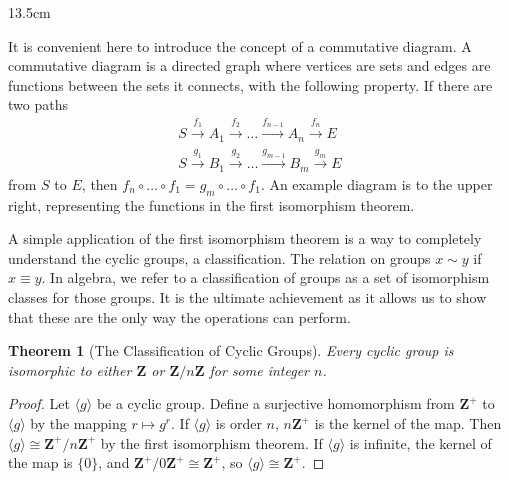 \documentclass[12pt]{report}
\newtheorem{theorem}{Theorem}[section]
\begin{document}
\begin{wrapfigure}{1}{3.5cm}
\end{wrapfigure}

It is convenient here to introduce the concept of a commutative diagram. A commutative diagram is a directed graph where vertices are sets and edges are functions between the sets it connects, with the following property. If there are two paths
%
\begin{align*}
    S \xrightarrow{f_1} A_1 \xrightarrow{f_2} \dots \xrightarrow{f_{n-1}} A_n \xrightarrow{f_n} E\\
    S \xrightarrow{g_1} B_1 \xrightarrow{g_2} \dots \xrightarrow{g_{m-1}} B_m \xrightarrow{g_m} E
\end{align*}
from $S$ to $E$, then $f_n \circ \dots \circ f_1 = g_m \circ \dots \circ f_1$. An example diagram is to the upper right, representing the functions in the first isomorphism theorem.

A simple application of the first isomorphism theorem is a way to completely understand the cyclic groups, a classification. The relation on groups $x \sim y$ if $x \equiv y$. In algebra, we refer to a classification of groups as a set of isomorphism classes for those groups. It is the ultimate achievement as it allows us to show that these are the only way the operations can perform.

\begin{theorem}[The Classification of Cyclic Groups]
    Every cyclic group is isomorphic to either $\mathbf{Z}$ or $\mathbf{Z}/n\mathbf{Z}$ for some integer $n$.
\end{theorem}
\begin{proof}
Let $\langle g \rangle$ be a cyclic group. Define a surjective homomorphism from $\mathbf{Z}^+$ to $\langle g \rangle$ by the mapping $r \mapsto g^r$. If $\langle g \rangle$ is order $n$, $n\mathbf{Z}^+$ is the kernel of the map. Then $\langle g \rangle \cong \mathbf{Z}^+/n\mathbf{Z}^+$ by the first isomorphism theorem. If $\langle g \rangle$ is infinite, the kernel of the map is $\{ 0 \}$, and $\mathbf{Z}^+/0\mathbf{Z}^+ \cong \mathbf{Z}^+$, so $\langle g \rangle \cong \mathbf{Z}^+$.
\end{proof}
\end{document}
